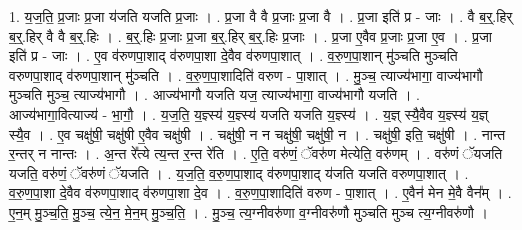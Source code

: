\documentclass[17pt]{extarticle}
\begin{document}
1. य॒ज॒ति॒ प्र॒जाः प्र॒जा य॑जति यजति प्र॒जाः । . प्र॒जा वै वै प्र॒जाः प्र॒जा वै । . प्र॒जा इति॑ प्र - जाः । . वै ब॒र्॒.हिर् ब॒र्॒.हिर् वै वै ब॒र्॒.हिः । . ब॒र्॒.हिः प्र॒जाः प्र॒जा ब॒र्॒.हिर् ब॒र्॒.हिः प्र॒जाः । . प्र॒जा ए॒वैव प्र॒जाः प्र॒जा ए॒व । . प्र॒जा इति॑ प्र - जाः । . ए॒व व॑रुणपा॒शाद् व॑रुणपा॒शा दे॒वैव व॑रुणपा॒शात् । . व॒रु॒ण॒पा॒शान् मु॑ञ्चति मुञ्चति वरुणपा॒शाद् व॑रुणपा॒शान् मु॑ञ्चति । . व॒रु॒ण॒पा॒शादिति॑ वरुण - पा॒शात् । . मु॒ञ्च॒ त्याज्य॑भागा॒ वाज्य॑भागौ मुञ्चति मुञ्च॒ त्याज्य॑भागौ । . आज्य॑भागौ यजति यज॒ त्याज्य॑भागा॒ वाज्य॑भागौ यजति । . आज्य॑भागा॒वित्याज्य॑ - भा॒गौ॒ । . य॒ज॒ति॒ य॒ज्ञ्स्य॑ य॒ज्ञ्स्य॑ यजति यजति य॒ज्ञ्स्य॑ । . य॒ज्ञ् स्यै॒वैव य॒ज्ञ्स्य॑ य॒ज्ञ् स्यै॒व । . ए॒व चक्षु॑षी॒ चक्षु॑षी ए॒वैव चक्षु॑षी । . चक्षु॑षी॒ न न चक्षु॑षी॒ चक्षु॑षी॒ न । . चक्षु॑षी॒ इति॒ चक्षु॑षी । . नान्त र॒न्तर् न नान्तः । . अ॒न्त रे᳚त्ये त्य॒न्त र॒न्त रे॑ति । . ए॒ति॒ वरु॑णं॒ ॅवरु॑ण मेत्येति॒ वरु॑णम् । . वरु॑णं ॅयजति यजति॒ वरु॑णं॒ ॅवरु॑णं ॅयजति । . य॒ज॒ति॒ व॒रु॒ण॒पा॒शाद् व॑रुणपा॒शाद् य॑जति यजति वरुणपा॒शात् । . व॒रु॒ण॒पा॒शा दे॒वैव व॑रुणपा॒शाद् व॑रुणपा॒शा दे॒व । . व॒रु॒ण॒पा॒शादिति॑ वरुण - पा॒शात् । . ए॒वैन॑ मेन मे॒वै वैन᳚म् । . ए॒न॒म् मु॒ञ्च॒ति॒ मु॒ञ्च॒ त्ये॒न॒ मे॒न॒म् मु॒ञ्च॒ति॒ । . मु॒ञ्च॒ त्य॒ग्नीवरु॑णा व॒ग्नीवरु॑णौ मुञ्चति मुञ्च त्य॒ग्नीवरु॑णौ । \newline
\end{document}

